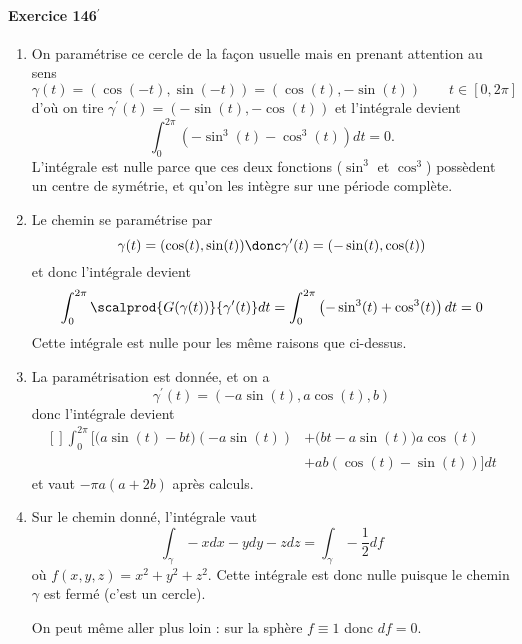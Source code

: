 \paragraph{Exercice 146$^\prime$}
\begin{enumerate}
\item On paramétrise ce cercle de la façon usuelle mais en prenant
attention au sens
\begin{equation*}
\gamma(t) = (\cos(-t),\sin(-t)) = (\cos(t),-\sin(t)) \qquad t \in [0,2\pi]
\end{equation*}
d'où on tire $\gamma^\prime(t) = (-\sin(t),-\cos(t))$ et l'intégrale
devient
\begin{equation*}
\int_0^{2\pi} (-\sin^3(t) - \cos^3(t)) d t = 0.
\end{equation*}
L'intégrale est nulle parce que ces deux fonctions ($\sin^3$ et
$\cos^3$) possèdent un centre de symétrie, et qu'on les intègre sur
une période complète.

\item Le chemin se paramétrise par 
\begin{equation*}
\gamma(t) = (\cos(t),\sin(t)) \donc \gamma^\prime(t) = (-\sin(t),\cos(t))
\end{equation*}
et donc l'intégrale devient
\begin{equation*}
\int_0^{2\pi} \scalprod{G(\gamma(t))}{\gamma^\prime(t)}d t =
\int_0^{2\pi} \left(-\sin^3(t) + \cos^3(t)\right)d t = 0
\end{equation*}
Cette intégrale est nulle pour les même raisons que ci-dessus.

\item
La paramétrisation est donnée, et on a 
\begin{equation*}
	\gamma^\prime(t) = (-a \sin(t), a \cos(t), b)
\end{equation*}
donc l'intégrale devient
\begin{equation}
	\begin{aligned}[]
		\int_0^{2\pi} \Big[ \big(a \sin(t) - b t\big) (-a\sin(t)) &+ \big(bt - a \sin(t)\big) a \cos(t) \\
		&+ ab(\cos(t)-\sin(t)) \Big] dt
	\end{aligned}
\end{equation}
et vaut $- \pi a (a+ 2b)$ après calculs.

\item
Sur le chemin donné, l'intégrale vaut
\begin{equation*}
	\int_\gamma -x d x - y d y - z d z = \int_\gamma - \frac12 d f
\end{equation*}
où $f(x,y,z) = x^2+y^2+z^2$. Cette intégrale est donc nulle puisque le chemin $\gamma$ est fermé (c'est un cercle).

On peut même aller plus loin : sur la sphère $f \equiv 1$ donc $df= 0$.
\end{enumerate}

